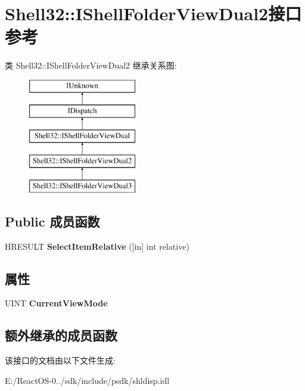 \hypertarget{interface_shell32_1_1_i_shell_folder_view_dual2}{}\section{Shell32\+:\+:I\+Shell\+Folder\+View\+Dual2接口 参考}
\label{interface_shell32_1_1_i_shell_folder_view_dual2}
类 Shell32\+:\+:I\+Shell\+Folder\+View\+Dual2 继承关系图\+:\begin{figure}[H]
\begin{center}
\leavevmode
\includegraphics[height=5.000000cm]{interface_shell32_1_1_i_shell_folder_view_dual2}
\end{center}
\end{figure}
\subsection*{Public 成员函数}
\begin{DoxyCompactItemize}
\item 
\mbox{\label{interface_shell32_1_1_i_shell_folder_view_dual2_a274ea0779e57cbc1f2831c6b8891522e}} 
H\+R\+E\+S\+U\+LT {\bfseries Select\+Item\+Relative} (\mbox{[}in\mbox{]} int relative)
\end{DoxyCompactItemize}
\subsection*{属性}
\begin{DoxyCompactItemize}
\item 
\mbox{\label{interface_shell32_1_1_i_shell_folder_view_dual2_af22dd5bbe2d13b134c899c98e6041d1e}} 
U\+I\+NT {\bfseries Current\+View\+Mode}
\end{DoxyCompactItemize}
\subsection*{额外继承的成员函数}


该接口的文档由以下文件生成\+:\begin{DoxyCompactItemize}
\item 
E\+:/\+React\+O\+S-\/0../sdk/include/psdk/shldisp.\+idl\end{DoxyCompactItemize}
